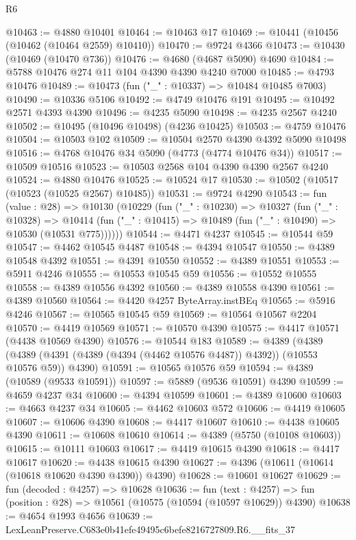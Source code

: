 \begin{lexlean}{R6}
\begin{coremodule}
@10463 := @4880 @10401
@10464 := @10463 @17
@10469 := @10441 (@10456 (@10462 (@10464 @2559) @10410))
@10470 := @9724 @4366
@10473 := @10430 (@10469 (@10470 @736))
@10476 := @4680 (@4687 @5090) @4690
@10484 := @5788 @10476 @274 @11 @104 @4390 @4390 @4240 @7000
@10485 := @4793 @10476
@10489 := @10473 (fun ("_" : @10337) => @10484 @10485 @7003)
@10490 := @10336 @5106
@10492 := @4749 @10476 @191
@10495 := @10492 @2571 @4393 @4390
@10496 := @4235 @5090
@10498 := @4235 @2567 @4240
@10502 := @10495 (@10496 @10498) (@4236 @10425)
@10503 := @4759 @10476
@10504 := @10503 @102
@10509 := @10504 @2570 @4390 @4392 @5090 @10498
@10516 := @4768 @10476 @34 @5090 (@4773 (@4774 @10476 @34))
@10517 := @10509 @10516
@10523 := @10503 @2568 @104 @4390 @4390 @2567 @4240
@10524 := @4880 @10476
@10525 := @10524 @17
@10530 := @10502 (@10517 (@10523 (@10525 @2567) @10485))
@10531 := @9724 @4290
@10543 := fun (value : @28) =>
  @10130
    (@10229
      (fun ("_" : @10230) =>
      @10327
        (fun ("_" : @10328) =>
        @10414 (fun ("_" : @10415) => @10489 (fun ("_" : @10490) => @10530 (@10531 @775))))))
@10544 := @4471 @4237
@10545 := @10544 @59
@10547 := @4462 @10545 @4487
@10548 := @4394 @10547
@10550 := @4389 @10548 @4392
@10551 := @4391 @10550
@10552 := @4389 @10551
@10553 := @5911 @4246
@10555 := @10553 @10545 @59
@10556 := @10552 @10555
@10558 := @4389 @10556 @4392
@10560 := @4389 @10558 @4390
@10561 := @4389 @10560
@10564 := @4420 @4257 ByteArray.instBEq
@10565 := @5916 @4246
@10567 := @10565 @10545 @59
@10569 := @10564 @10567 @2204
@10570 := @4419 @10569
@10571 := @10570 @4390
@10575 := @4417 @10571 (@4438 @10569 @4390)
@10576 := @10544 @183
@10589 := @4389
    (@4389 (@4389 (@4391 (@4389 (@4394 (@4462 @10576 @4487)) @4392)) (@10553 @10576 @59)) @4390)
@10591 := @10565 @10576 @59
@10594 := @4389 (@10589 (@9533 @10591))
@10597 := @5889 (@9536 @10591) @4390
@10599 := @4659 @4237 @34
@10600 := @4394 @10599
@10601 := @4389 @10600
@10603 := @4663 @4237 @34
@10605 := @4462 @10603 @572
@10606 := @4419 @10605
@10607 := @10606 @4390
@10608 := @4417 @10607
@10610 := @4438 @10605 @4390
@10611 := @10608 @10610
@10614 := @4389 (@5750 (@10108 @10603))
@10615 := @10111 @10603
@10617 := @4419 @10615 @4390
@10618 := @4417 @10617
@10620 := @4438 @10615 @4390
@10627 := @4396 (@10611 (@10614 (@10618 @10620 @4390 @4390)) @4390)
@10628 := @10601 @10627
@10629 := fun (decoded : @4257) => @10628
@10636 := fun (text : @4257) =>
  fun (position : @28) => @10561 (@10575 (@10594 (@10597 @10629)) @4390)
@10638 := @4654 @1993 @4656
@10639 := LexLeanPreserve.C683e0b41efe49495c6befe8216727809.R6.__fits_37

\end{coremodule}
\end{lexlean}
